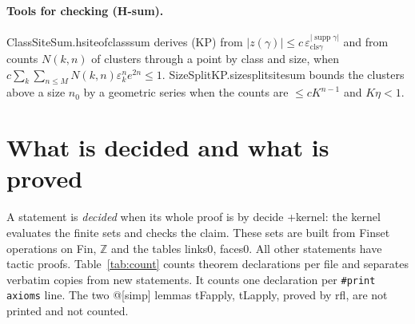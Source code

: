 \documentclass[11pt,a4paper]{article}
\theoremstyle{definition}
\theoremstyle{remark}
\DeclareRobustCommand{\lean}[1]{{\ttfamily\renewcommand{\_}{\textunderscore\allowbreak}#1}}
\newcommand{\supp}{\operatorname{supp}}
\begin{document}
\paragraph{Tools for checking (H-sum).} \lean{ClassSiteSum.hsite\_of\_class\_sum} derives (KP) from $|z(\gamma)|\le c\,\varepsilon_{\mathrm{cls}\gamma}^{|\supp\gamma|}$ and from counts $N(k,n)$ of clusters through a point by class and size, when $c\sum_k\sum_{n\le M}N(k,n)\varepsilon_k^ne^{2n}\le1$. \lean{SizeSplitKP.size\_split\_site\_sum} bounds the clusters above a size $n_0$ by a geometric series when the counts are $\le cK^{n-1}$ and $K\eta<1$.

\section{What is decided and what is proved}\label{sec:decided}

A statement is \emph{decided} when its whole proof is \lean{by decide +kernel}: the kernel evaluates the finite sets and checks the claim. These sets are built from \lean{Finset} operations on \lean{Fin}, $\mathbb{Z}$ and the tables \lean{links0}, \lean{faces0}. All other statements have tactic proofs. Table~\ref{tab:count} counts theorem declarations per file and separates verbatim copies from new statements. It counts one declaration per \texttt{\#print axioms} line. The two \lean{@[simp]} lemmas \lean{tF\_apply}, \lean{tL\_apply}, proved by \lean{rfl}, are not printed and not counted.
\end{document}

